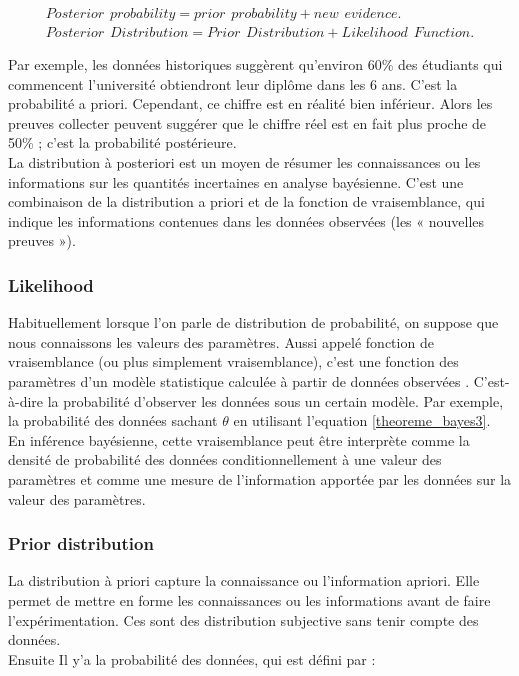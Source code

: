\begin{equation}
    \begin{split}
		Posterior \hspace{5pt} probability = prior \hspace{5pt} probability + new \hspace{5pt} evidence. \\
        Posterior \hspace{5pt} Distribution = Prior \hspace{5pt} Distribution + Likelihood \hspace{5pt} Function.
	\end{split}
	\label{posterior_probability_distribution}
\end{equation}

Par exemple, les données historiques suggèrent qu'environ 60\% des étudiants qui commencent l'université obtiendront leur diplôme dans les 6 ans. C'est la probabilité a priori. Cependant, ce chiffre est en réalité bien inférieur. Alors les preuves collecter peuvent suggérer que le chiffre réel est en fait plus proche de 50\% ; c'est la probabilité postérieure. \\
La distribution à posteriori est un moyen de résumer les connaissances ou les informations sur les quantités incertaines en analyse bayésienne. C'est une combinaison de la distribution a priori et de la fonction de vraisemblance, qui indique les informations contenues dans les données observées (les « nouvelles preuves »).

\subsubsection{Likelihood}
Habituellement lorsque l’on parle de distribution de probabilité, on suppose que nous connaissons les valeurs des paramètres. Aussi appelé fonction de vraisemblance (ou plus simplement vraisemblance), c’est une fonction des paramètres d'un modèle statistique calculée à partir de données observées \cite{fisher1922mathematical}. C’est-à-dire la probabilité d’observer les données sous un certain modèle. Par exemple, la probabilité des données sachant \(\displaystyle \theta \) en utilisant l'equation \ref{theoreme_bayes3}.
En inférence bayésienne, cette vraisemblance peut être interprète comme la densité de probabilité des données conditionnellement à une valeur des paramètres et comme une mesure de l'information apportée par les données sur la valeur des paramètres.

\subsubsection{Prior distribution}
La distribution à priori capture la connaissance ou l’information apriori. Elle permet de mettre en forme les connaissances ou les informations avant de faire l’expérimentation. Ces sont des distribution subjective sans tenir compte des données. \\
Ensuite Il y’a la probabilité des données, qui est défini par :

